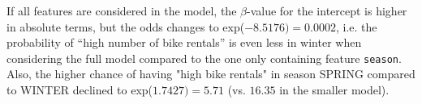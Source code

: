 {\begin{enumerate}[a)]
	If all features are considered in the model, the $\beta$-value for the intercept is higher in absolute terms, but the odds changes to exp($-8.5176) = 0.0002$, i.e. the probability of ``high number of bike rentals'' is even less in winter when considering the full model compared to the one only containing feature \texttt{season}. Also, the higher chance of having "high bike rentals" in season SPRING compared to WINTER declined to exp($1.7427)=5.71$ (vs. $16.35$ in the smaller model).
\end{enumerate}
}
